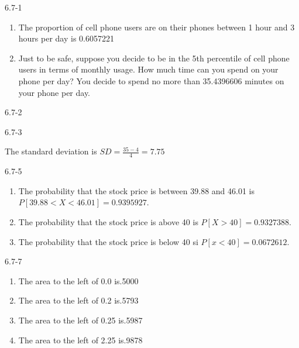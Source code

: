 \begin{exsol@solution}{6.7-1}

\begin{enumerate}
	\item The proportion of cell phone users are on their phones between 1 hour
and 3 hours per day is 0.6057221
  \item Just to be safe, suppose you decide to be in the 5th percentile of
cell phone users in terms of monthly usage.  How much time can you spend on your phone per day? You decide to spend no more than 35.4396606 minutes on your phone per day.
	\end{enumerate}
\end{exsol@solution}
\begin{exsol@solution}{6.7-2}
%

\end{exsol@solution}
\begin{exsol@solution}{6.7-3}


    The standard deviation is $SD = \frac{35 - 4}{4} = 7.75$
\end{exsol@solution}
\begin{exsol@solution}{6.7-5}

\begin{enumerate}
\item The probability that the stock price is between 39.88 and 46.01 is $P[39.88 < X < 46.01] = 0.9395927$.
\item The probability that the stock price is above 40 is $P[X > 40] = 0.9327388$.
\item The probability that the stock price is below 40 si $P[ x < 40] = 0.0672612$.
\end{enumerate}
\end{exsol@solution}
\begin{exsol@solution}{6.7-7}
\begin{enumerate}
\item The area to the left of 0.0 is.5000
\item The area to the left of 0.2 is.5793
\item The area to the left of 0.25 is.5987
\item The area to the left of 2.25 is.9878
\end{enumerate}
\end{exsol@solution}
